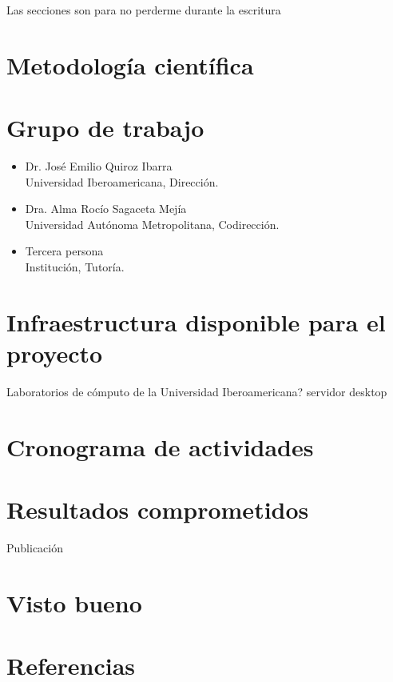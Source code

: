 \documentclass[12pt,letterpaper,final]{article}
\begin{document}
%
Las secciones son para no perderme durante la escritura


%


\section {Metodología científica}
\section {Grupo de trabajo}

\begin{itemize}
	\item Dr. José Emilio Quiroz Ibarra\\
	Universidad Iberoamericana, Dirección.
	\item Dra. Alma Rocío Sagaceta Mejía\\
	Universidad Autónoma Metropolitana, Codirección.
	\item Tercera persona\\
	Institución, Tutoría.
\end{itemize}
\section {Infraestructura disponible para el proyecto}
Laboratorios de cómputo de la Universidad Iberoamericana?
servidor
desktop
\section {Cronograma de actividades}
\section {Resultados comprometidos}
Publicación
\section {Visto bueno}
\section {Referencias}
\printbibliography[heading=none]
\end{document}
